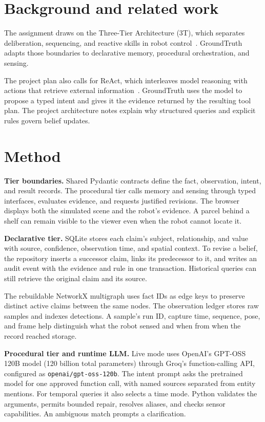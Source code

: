 \documentclass[11pt,a4paper,twocolumn]{article}
\begin{document}
\section{Background and related work}
The assignment draws on the Three-Tier Architecture (3T), which
separates deliberation, sequencing, and reactive skills in robot
control~\cite{bonasso1997}. GroundTruth adapts those boundaries to
declarative memory, procedural orchestration, and sensing.

The project plan also calls for ReAct, which interleaves model
reasoning with actions that retrieve external information~\cite{yao2023}.
GroundTruth uses the model to propose a typed intent and gives it the
evidence returned by the resulting tool plan. The project architecture
notes explain why structured queries and explicit rules govern belief
updates.

\section{Method}
\textbf{Tier boundaries.} Shared Pydantic contracts define the fact,
observation, intent, and result records. The procedural tier calls
memory and sensing through typed interfaces, evaluates evidence, and
requests justified revisions. The browser displays both the simulated
scene and the robot's evidence. A parcel behind a shelf can remain
visible to the viewer even when the robot cannot locate it.

\textbf{Declarative tier.} SQLite stores each claim's subject,
relationship, and value with source, confidence, observation time, and
spatial context. To revise a belief, the repository inserts a successor
claim, links its predecessor to it, and writes an audit event with the
evidence and rule in one transaction. Historical queries can still
retrieve the original claim and its source.

The rebuildable NetworkX multigraph uses fact IDs as edge keys to
preserve distinct active claims between the same nodes. The observation
ledger stores raw samples and indexes detections. A sample's run ID,
capture time, sequence, pose, and frame help distinguish what the robot
sensed and when from when the record reached storage.

\textbf{Procedural tier and runtime LLM.} Live mode uses OpenAI's GPT-OSS
120B model (120 billion total parameters) through Groq's function-calling
API, configured as \texttt{openai/gpt-oss-120b}. The intent prompt asks the pretrained
model for one approved function call, with named sources separated
from entity mentions. For temporal queries it also selects a time
mode. Python validates the arguments, permits bounded repair,
resolves aliases, and checks sensor capabilities. An ambiguous match
prompts a clarification.
\end{document}
